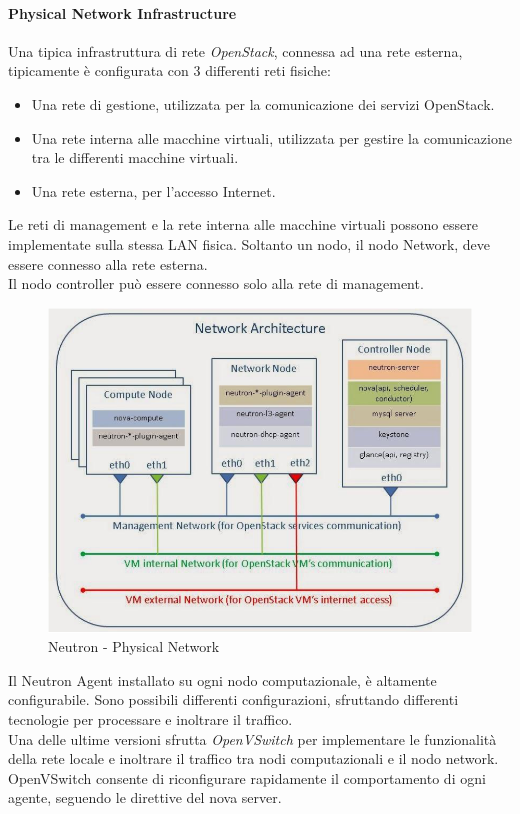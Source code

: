 \documentclass{article}
\begin{document}
\paragraph{Physical Network Infrastructure}
Una tipica infrastruttura di rete \textit{OpenStack}, connessa ad una rete esterna, tipicamente è configurata con 3 differenti reti fisiche:
\begin{itemize}
    \item Una rete di gestione, utilizzata per la comunicazione dei servizi OpenStack.
    \item Una rete interna alle macchine virtuali, utilizzata per gestire la comunicazione tra le differenti macchine virtuali.
    \item Una rete esterna, per l'accesso Internet.
\end{itemize}
Le reti di management e la rete interna alle macchine virtuali possono essere implementate sulla stessa LAN fisica. Soltanto un nodo, il nodo Network, deve essere connesso alla rete esterna. \\
Il nodo controller può essere connesso solo alla rete di management.
\begin{figure}[H]
    \centering
    \includegraphics[scale=0.5]{img/neutron physical network.png}
    \caption{Neutron - Physical Network}
\end{figure}\noindent
Il Neutron Agent installato su ogni nodo computazionale, è altamente configurabile. Sono possibili differenti configurazioni, sfruttando differenti tecnologie per processare e inoltrare il traffico. \\ 
Una delle ultime versioni sfrutta \textit{OpenVSwitch} per implementare le funzionalità della rete locale e inoltrare il traffico tra nodi computazionali e il nodo network. OpenVSwitch consente di riconfigurare rapidamente il comportamento di ogni agente, seguendo le direttive del nova server.
\end{document}
